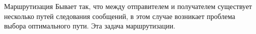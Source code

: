 \documentclass[ignorenonframetext, hyperref={pdftex, unicode}]{beamer}
\begin{document}
\begin{frame}{Маршрутизация}
	Бывает так,  что между отправителем и получателем существует несколько путей следования сообщений,  в этом случае возникает проблема выбора оптимального пути. Эта задача маршрутизации.
\end{frame}

\begin{frame}{}
\end{frame}

\begin{frame}{}
\end{frame}


\begin{frame}{}
\end{frame}


\begin{frame}{}
\end{frame}


\begin{frame}{}
\end{frame}


\begin{frame}{}
\end{frame}


\begin{frame}{}
\end{frame}


\begin{frame}{}
\end{frame}


\begin{frame}{}
\end{frame}


\begin{frame}{}
\end{frame}
\end{document}
